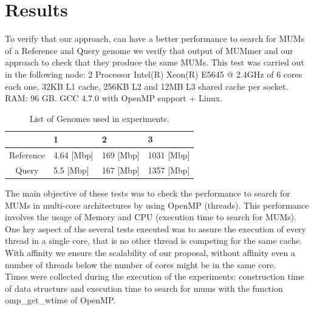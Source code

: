 \documentclass[runningheads,a4paper]{llncs}
\begin{document}
\section{Results}
To verify that our approach, can have a better performance to search for MUMs of a Reference and Query genome we verify that output of MUMmer and our approach to check that they produce the same MUMs. This test was carried out in the following node: 2 Processor Intel(R) Xeon(R) E5645 @ 2.4GHz of 6 cores each one, 32KB L1 cache, 256KB L2 and 12MB L3 shared cache per socket. RAM: 96 GB. GCC 4.7.0 with OpenMP support + Linux. 
\begin{table}
\centering
\caption{List of Genomes used in experiments.}
\label{genomes}
\begin{tabular}{|c|l|l|l|} \hline
  & 1 & 2 & 3 \\ \hline
  Reference & 4.64 [Mbp] & 169 [Mbp] & 1031 [Mbp] \\ \hline
  Query & 5.5 [Mbp] & 167 [Mbp] & 1357 [Mbp] \\ 
  \hline
\end{tabular}
\end{table}
The main objective of these tests was to check the performance to search for MUMs in multi-core architectures by using OpenMP (threads). This performance involves the usage of Memory and CPU (execution time to search for MUMs).\\
One key aspect of the several tests executed was to assure the execution of every thread in a single core, that is no other thread is competing for the same cache. With affinity we ensure the scalability of our proposal, without affinity even a number of threads below the number of cores might be in the same core. \\
Times were collected during the execution of the experiments: construction time of data structure and execution time to search for mums with the function omp\_get\_wtime of OpenMP.\\
\end{document}
